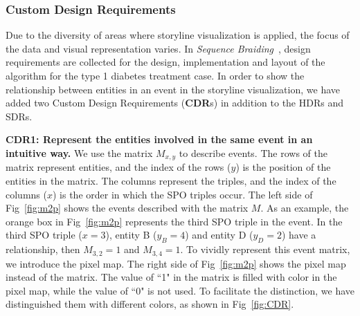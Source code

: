 \documentclass[review,journal]{vgtc}         %
\begin{document}
\subsubsection{Custom Design Requirements}
\noindent Due to the diversity of areas where storyline visualization is applied, the focus of the data and visual representation varies. In \textit{Sequence Braiding}~\cite{di_bartolomeo_s_2020}, design requirements are collected for the design, implementation and layout of the algorithm for the type 1 diabetes treatment case. In order to show the relationship between entities in an event in the storyline visualization, we have added two Custom Design Requirements (\textbf{CDR}s) in addition to the HDRs and SDRs.

  \textbf{CDR1: Represent the entities involved in the same event in an intuitive way.} We use the matrix \textbf{$M_{x,y}$} to describe events. The rows of the matrix represent entities, and the index of the rows  ($y$) is the position of the entities in the matrix. The columns represent the triples, and the index of the columns ($x$) is the order in which the SPO triples occur. The left side of Fig~\ref{fig:m2p} shows the events described with the matrix $M$.  As an example, the orange box in Fig~\ref{fig:m2p} represents the third SPO triple in the event. In the third SPO triple ($x = 3$), entity B ($y_B = 4$) and entity D ($y_D = 2$) have a relationship, then $M_{3,2} = 1$ and $M_{3,4} = 1$. To vividly represent this event matrix, we introduce the pixel map. The right side of Fig~\ref{fig:m2p} shows the pixel map instead of the matrix. The value of ``1" in the matrix is filled with color in the pixel map, while the value of ``0" is not used. To facilitate the distinction, we have distinguished them with different colors, as shown in Fig~\ref{fig:CDR}.
\end{document}
